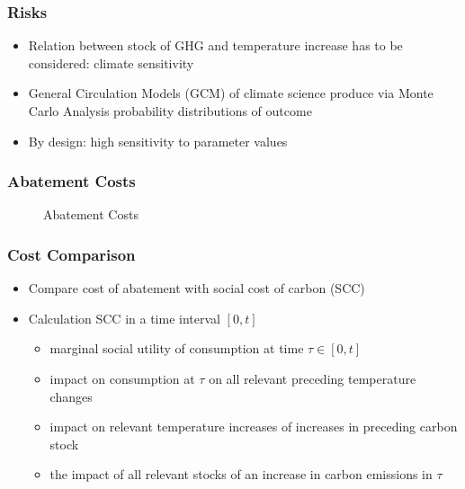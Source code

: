 \begin{frame}
\frametitle{Risks}
\begin{itemize}
\item<1-> Relation between stock of GHG and temperature increase has to be considered: climate sensitivity
\item<2-> General Circulation Models (GCM) of climate science produce via Monte Carlo Analysis probability distributions of outcome
\item<3-> By design: high sensitivity to parameter values
\end{itemize}
\end{frame}

\begin{frame}\frametitle{Abatement Costs}
\begin{center}
\begin{figure}[h!]
\centering
{} %
\caption{Abatement Costs}
\label{fig:abatement}
\end{figure}
\end{center}
\end{frame}



\begin{frame}
\frametitle{Cost Comparison}
\begin{itemize}
\item<1-> Compare cost of abatement with social cost of carbon (SCC)
\item<2-> Calculation SCC in a time interval $[0,t]$
\begin{itemize}
\item marginal social utility of consumption at time $\tau \in [0,t]$
\item impact on consumption at $\tau$ on all relevant preceding temperature changes
\item impact on relevant temperature increases of increases in preceding carbon stock
\item the impact of all relevant stocks of an increase in carbon emissions in $\tau$
\end{itemize}
\end{itemize}
\end{frame}


